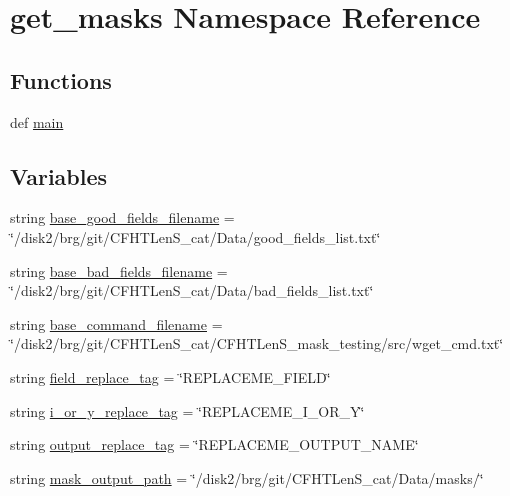 \hypertarget{namespaceget__masks}{\section{get\-\_\-masks Namespace Reference}
\label{namespaceget__masks}
}
\subsection*{Functions}
\begin{DoxyCompactItemize}
\item 
def \hyperlink{namespaceget__masks_a45c59d2d45c1e1bf88f3c7f79e598558}{main}
\end{DoxyCompactItemize}
\subsection*{Variables}
\begin{DoxyCompactItemize}
\item 
string \hyperlink{namespaceget__masks_abe60bb87ec8734a7d355ce3cde50e686}{base\-\_\-good\-\_\-fields\-\_\-filename} = \char`\"{}/disk2/brg/git/C\-F\-H\-T\-Len\-S\-\_\-cat/Data/good\-\_\-fields\-\_\-list.\-txt\char`\"{}
\item 
string \hyperlink{namespaceget__masks_a2381f56dab6f54df7ec5b9524efed2b5}{base\-\_\-bad\-\_\-fields\-\_\-filename} = \char`\"{}/disk2/brg/git/C\-F\-H\-T\-Len\-S\-\_\-cat/Data/bad\-\_\-fields\-\_\-list.\-txt\char`\"{}
\item 
string \hyperlink{namespaceget__masks_a42c3003d294025981e1d3563c771c11a}{base\-\_\-command\-\_\-filename} = \char`\"{}/disk2/brg/git/C\-F\-H\-T\-Len\-S\-\_\-cat/C\-F\-H\-T\-Len\-S\-\_\-mask\-\_\-testing/src/wget\-\_\-cmd.\-txt\char`\"{}
\item 
string \hyperlink{namespaceget__masks_ad7d01a44c76fbc862e6a10375d78c260}{field\-\_\-replace\-\_\-tag} = \char`\"{}R\-E\-P\-L\-A\-C\-E\-M\-E\-\_\-\-F\-I\-E\-L\-D\char`\"{}
\item 
string \hyperlink{namespaceget__masks_aeefd8d2fe08e35ede8f9e5f04e7e451e}{i\-\_\-or\-\_\-y\-\_\-replace\-\_\-tag} = \char`\"{}R\-E\-P\-L\-A\-C\-E\-M\-E\-\_\-\-I\-\_\-\-O\-R\-\_\-\-Y\char`\"{}
\item 
string \hyperlink{namespaceget__masks_aa6a6668dc8737ccc73f1cd09d0c998ad}{output\-\_\-replace\-\_\-tag} = \char`\"{}R\-E\-P\-L\-A\-C\-E\-M\-E\-\_\-\-O\-U\-T\-P\-U\-T\-\_\-\-N\-A\-M\-E\char`\"{}
\item 
string \hyperlink{namespaceget__masks_a2b36e96dbe06aff7c726295a0f34af97}{mask\-\_\-output\-\_\-path} = \char`\"{}/disk2/brg/git/C\-F\-H\-T\-Len\-S\-\_\-cat/Data/masks/\char`\"{}
\end{DoxyCompactItemize}


